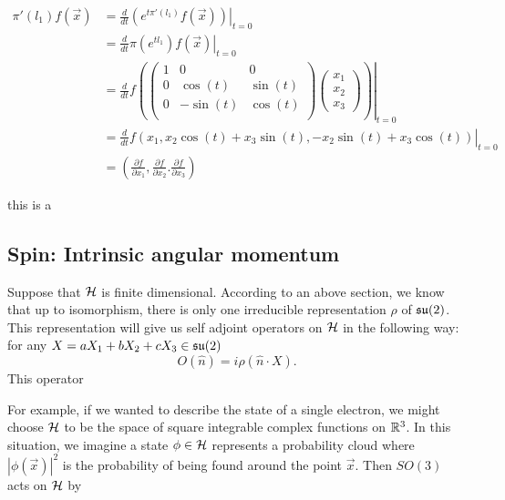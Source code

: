 \documentclass[a4paper]{article}
\begin{document}
\begin{align*}
    \pi'(l_1)f(\vec{x}) &= \left. \frac{d}{dt} \left(e^{t\pi'(l_1)}f(\vec{x})\right) \right|_{t=0}\\
    &= \left. \frac{d}{dt} \pi\left(e^{t l_1}\right)f(\vec{x}) \right|_{t=0}\\ 
    &= \left. \frac{d}{dt} f\left(\begin{pmatrix} 1 & 0 & 0 \\ 0 & \cos(t) & \sin(t) \\ 0 & -\sin(t) & \cos(t) \\ \end{pmatrix} \begin{pmatrix}x_1 \\ x_2 \\ x_3 \end{pmatrix}\right) \right|_{t=0}\\
    &= \left. \frac{d}{dt} f(x_1, x_2\cos(t) + x_3 \sin(t), -x_2\sin(t) + x_3 \cos(t)) \right|_{t=0}\\ 
    &= \left( \frac{\partial f}{\partial x_1}, \frac{\partial f}{\partial x_2}. \frac{\partial f}{\partial x_3}\right)  
\end{align*}


this is a 


\subsection{Spin: Intrinsic angular momentum}
Suppose that $\mathcal{H}$ is finite dimensional. According to an above section, we know that up to isomorphism, there is only one irreducible representation $\rho$ of $\mathfrak{su}(2)$. This representation will give us self adjoint operators on $\mathcal{H}$ in the following way: for any $X = a X_1 + b X_2 + c X_3 \in \mathfrak{su}(2)$
$$O(\hat{n}) = i\rho(\hat{n} \cdot X).$$
This operator 

For example, if we wanted to describe the state of a single electron, we might choose $\mathcal{H}$ to be the space of square integrable complex functions on $\mathbb{R}^3$. In this situation, we imagine a state $\phi \in \mathcal{H}$ represents a probability cloud where $|\phi(\vec{x})|^2$ is the probability of being found around the point $\vec{x}$. Then $SO(3)$ acts on $\mathcal{H}$ by 
\end{document}
